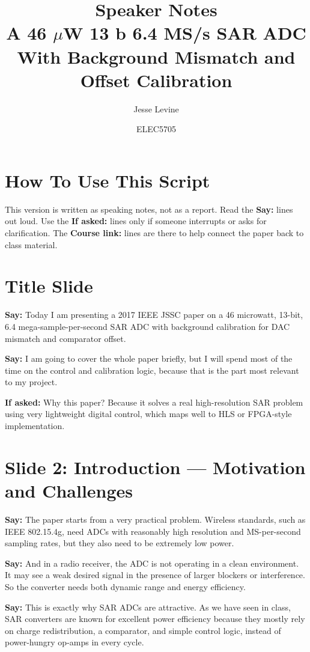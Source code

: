 \documentclass[11pt]{article}
\title{Speaker Notes\\
A 46 $\mu$W 13 b 6.4 MS/s SAR ADC With Background Mismatch and Offset Calibration}
\author{Jesse Levine}
\date{ELEC5705}
\newcommand{\speak}[1]{\textbf{Say:} #1}
\newcommand{\ifasked}[1]{\textbf{If asked:} #1}
\begin{document}
\maketitle

\section*{How To Use This Script}
This version is written as speaking notes, not as a report. Read the \textbf{Say:} lines out loud. Use the \textbf{If asked:} lines only if someone interrupts or asks for clarification. The \textbf{Course link:} lines are there to help connect the paper back to class material.

\section*{Title Slide}
\speak{Today I am presenting a 2017 IEEE JSSC paper on a 46 microwatt, 13-bit, 6.4 mega-sample-per-second SAR ADC with background calibration for DAC mismatch and comparator offset.}

\speak{I am going to cover the whole paper briefly, but I will spend most of the time on the control and calibration logic, because that is the part most relevant to my project.}

\ifasked{Why this paper? Because it solves a real high-resolution SAR problem using very lightweight digital control, which maps well to HLS or FPGA-style implementation.}

\section*{Slide 2: Introduction --- Motivation and Challenges}
\speak{The paper starts from a very practical problem. Wireless standards, such as IEEE 802.15.4g, need ADCs with reasonably high resolution and MS-per-second sampling rates, but they also need to be extremely low power.}

\speak{And in a radio receiver, the ADC is not operating in a clean environment. It may see a weak desired signal in the presence of larger blockers or interference. So the converter needs both dynamic range and energy efficiency.}

\speak{This is exactly why SAR ADCs are attractive. As we have seen in class, SAR converters are known for excellent power efficiency because they mostly rely on charge redistribution, a comparator, and simple control logic, instead of power-hungry op-amps in every cycle.}
\end{document}
